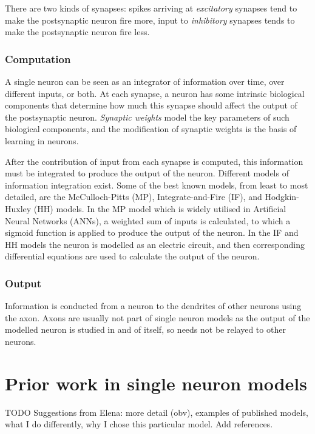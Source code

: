 \documentclass[a4paper,12pt]{report}
\theoremstyle{definition}
\begin{document}
There are two kinds of synapses: spikes arriving at \emph{excitatory} synapses tend to make the postsynaptic neuron fire more, input to \emph{inhibitory} synapses tends to make the postsynaptic neuron fire less.


\subsubsection{Computation}
A single neuron can be seen as an integrator of information over time, over different inputs, or both. At each synapse, a neuron has some intrinsic biological components that determine how much this synapse should affect the output of the postsynaptic neuron. \emph{Synaptic weights} model the key parameters of such biological components, and the modification of synaptic weights is the basis of learning in neurons.

After the contribution of input from each synapse is computed, this information must be integrated to produce the output of the neuron. Different models of information integration exist. Some of the best known models, from least to most detailed, are the McCulloch-Pitts (MP), Integrate-and-Fire (IF), and Hodgkin-Huxley (HH) models. In the MP model which is widely utilised in Artificial Neural Networks (ANNs), a weighted sum of inputs is calculated, to which a sigmoid function is applied to produce the output of the neuron. In the IF and HH models the neuron is modelled as an electric circuit, and then corresponding differential equations are used to calculate the output of the neuron.

\subsubsection{Output}

Information is conducted from a neuron to the dendrites of other neurons using the axon. Axons are usually not part of single neuron models as the output of the modelled neuron is studied in and of itself, so needs not be relayed to other neurons.

\section{Prior work in single neuron models}
TODO Suggestions from Elena: more detail (obv), examples of published models, what I do differently, why I chose this particular model. Add references.
\end{document}
